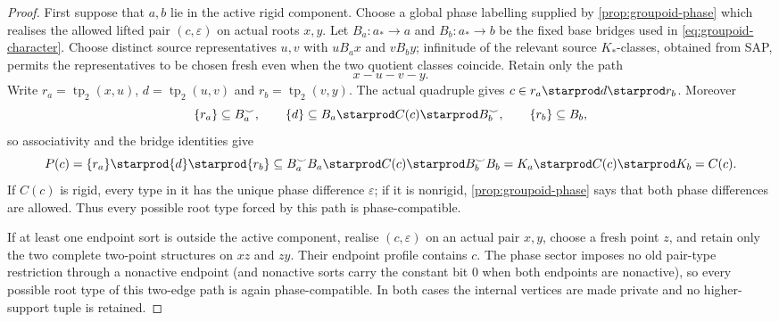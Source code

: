 \begin{proof}
First suppose that $a,b$ lie in the active rigid component.  Choose a global
phase labelling supplied by \cref{prop:groupoid-phase} which realises the
allowed lifted pair $(c,\varepsilon)$ on actual roots $x,y$.  Let
$B_a:a_*\to a$ and $B_b:a_*\to b$ be the fixed base bridges used in
\eqref{eq:groupoid-character}.  Choose distinct source representatives
$u,v$ with $uB_ax$ and $vB_by$; infinitude of the relevant source
$K_*$-classes, obtained from SAP, permits the representatives to be chosen
fresh even when the two quotient classes coincide.  Retain only the path
\[
        x-u-v-y.
\]
Write
$r_a=\operatorname{tp}_2(x,u)$,
$d=\operatorname{tp}_2(u,v)$ and
$r_b=\operatorname{tp}_2(v,y)$.  The actual quadruple gives
$c\in r_a\starprod d\starprod r_b$.  Moreover
\[
 \{r_a\}\subseteq B_a^{\smile},\qquad
 \{d\}\subseteq B_a\starprod C(c)\starprod B_b^{\smile},\qquad
 \{r_b\}\subseteq B_b,
\]
so associativity and the bridge identities give
\[
 P(c)=\{r_a\}\starprod\{d\}\starprod\{r_b\}
 \subseteq
 B_a^{\smile}B_a\starprod C(c)\starprod
 B_b^{\smile}B_b
 =K_a\starprod C(c)\starprod K_b=C(c).
\]
If $C(c)$ is rigid, every type in it has the unique phase difference
$\varepsilon$; if it is nonrigid, \cref{prop:groupoid-phase} says that both
phase differences are allowed.  Thus every possible root type forced by this
path is phase-compatible.

If at least one endpoint sort is outside the active component, realise
$(c,\varepsilon)$ on an actual pair $x,y$, choose a fresh point $z$, and
retain only the two complete two-point structures on $xz$ and $zy$.  Their
endpoint profile contains $c$.  The phase sector imposes no old pair-type
restriction through a nonactive endpoint (and nonactive sorts carry the
constant bit $0$ when both endpoints are nonactive), so every possible root
type of this two-edge path is again phase-compatible.  In both cases the
internal vertices are made private and no higher-support tuple is retained.
\end{proof}


